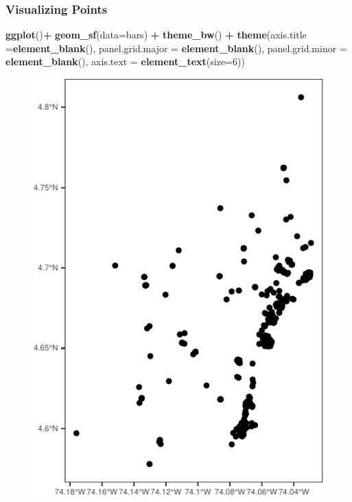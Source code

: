 \documentclass[
  shownotes,
  xcolor={svgnames},
  hyperref={colorlinks,citecolor=DarkBlue,linkcolor=DarkRed,urlcolor=DarkBlue}
  ]{beamer}
\newenvironment{Shaded}{\begin{snugshade}}{\end{snugshade}}
\newcommand{\DataTypeTok}[1]{\textcolor[rgb]{0.13,0.29,0.53}{#1}}
\newcommand{\DecValTok}[1]{\textcolor[rgb]{0.00,0.00,0.81}{#1}}
\newcommand{\KeywordTok}[1]{\textcolor[rgb]{0.13,0.29,0.53}{\textbf{#1}}}
\newcommand{\NormalTok}[1]{#1}
\newcommand{\OperatorTok}[1]{\textcolor[rgb]{0.81,0.36,0.00}{\textbf{#1}}}
\newcommand{\StringTok}[1]{\textcolor[rgb]{0.31,0.60,0.02}{#1}}
\begin{document}
\begin{frame}[fragile]
\frametitle{Visualizing Points}

\begin{minipage}[t]{0.52\linewidth}
        \begin{scriptsize}
           \begin{Shaded}
			\begin{Highlighting}[]
\KeywordTok{ggplot}\NormalTok{()}\OperatorTok{+}
\StringTok{  }\KeywordTok{geom\_sf}\NormalTok{(}\DataTypeTok{data=}\NormalTok{bars) }\OperatorTok{+}
\StringTok{  }\KeywordTok{theme\_bw}\NormalTok{() }\OperatorTok{+}
\StringTok{  }\KeywordTok{theme}\NormalTok{(}\DataTypeTok{axis.title =}\KeywordTok{element\_blank}\NormalTok{(),}
\DataTypeTok{panel.grid.major =} \KeywordTok{element\_blank}\NormalTok{(),}
\DataTypeTok{panel.grid.minor =} \KeywordTok{element\_blank}\NormalTok{(),}
\DataTypeTok{axis.text =} \KeywordTok{element\_text}\NormalTok{(}\DataTypeTok{size=}\DecValTok{6}\NormalTok{))}
			\end{Highlighting}
			\end{Shaded}
			            
        \end{scriptsize}
    \end{minipage}
    \hfill
    \begin{minipage}[t]{0.43\linewidth}%
        \begin{figure}[H] \centering
            \captionsetup{justification=centering}  
            \includegraphics[scale=0.6]{figures/unnamed-chunk-1-1.pdf}
    \end{figure}
    \end{minipage}



\end{frame}
\end{document}
